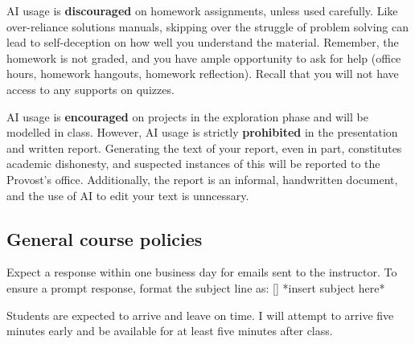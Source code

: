 \documentclass{syllabus}
\begin{document}
AI usage is \textbf{discouraged} on homework assignments, unless used carefully. Like over-reliance solutions manuals, skipping over the struggle of problem solving can lead to self-deception on how well you understand the material. Remember, the homework is not graded, and you have ample opportunity to ask for help (office hours, homework hangouts, homework reflection). Recall that you will not have access to any supports on quizzes.

AI usage is \textbf{encouraged} on projects in the exploration phase and will be modelled in class. However, AI usage is strictly \textbf{prohibited} in the presentation and written report. Generating the text of your report, even in part, constitutes academic dishonesty, and suspected instances of this will be reported to the Provost's office. Additionally, the report is an informal, handwritten document, and the use of AI to edit your text is unncessary.

\subsection{General course policies}
Expect a response within one business day for emails sent to the instructor. To ensure a prompt response, format the subject line as: [\coursecode] *insert subject here*

Students are expected to arrive and leave on time. I will attempt to arrive five minutes early and be available for at least five minutes after class.
\collegepolicies
\end{document}
